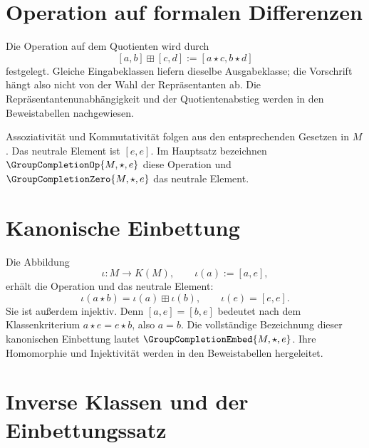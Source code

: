 {}

\section{Operation auf formalen Differenzen}

Die Operation auf dem Quotienten wird durch
\[
  [a,b]\boxplus[c,d]:=[a\star c,b\star d]
\]
festgelegt. Gleiche Eingabeklassen liefern dieselbe Ausgabeklasse;
die Vorschrift hängt also nicht von der Wahl der Repräsentanten ab.
Die %
  {Repräsentantenunabhängigkeit} und der
%
  {Quotientenabstieg} werden in den Beweistabellen nachgewiesen.

Assoziativität und Kommutativität folgen aus den entsprechenden
Gesetzen in \(M\). Das neutrale Element ist \([e,e]\).
Im Hauptsatz bezeichnen
\(\GroupCompletionOp{M,\star,e}\) diese Operation und
\(\GroupCompletionZero{M,\star,e}\) das neutrale Element.

{}
{}

\section{Kanonische Einbettung}

Die Abbildung
\[
  \iota\colon M\to K(M),\qquad \iota(a):=[a,e],
\]
erhält die Operation und das neutrale Element:
\[
  \iota(a\star b)=\iota(a)\boxplus\iota(b),\qquad
  \iota(e)=[e,e].
\]
Sie ist außerdem injektiv. Denn \([a,e]=[b,e]\) bedeutet nach dem
Klassenkriterium \(a\star e=e\star b\), also \(a=b\).
Die vollständige Bezeichnung dieser kanonischen Einbettung lautet
\(\GroupCompletionEmbed{M,\star,e}\).
Ihre %
  {Homomorphie} und
%
  {Injektivität} werden in den Beweistabellen hergeleitet.

{}

\section{Inverse Klassen und der Einbettungssatz}

